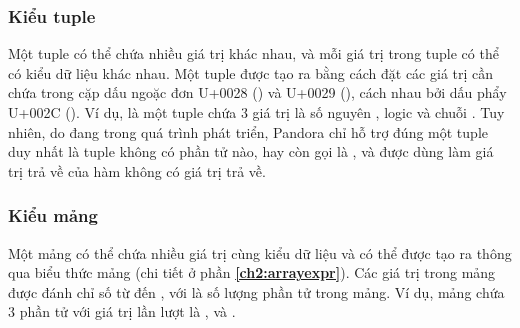 \subsubsection{Kiểu tuple}

    Một tuple có thể chứa nhiều giá trị khác nhau, và mỗi giá trị trong tuple có thể có kiểu dữ liệu khác nhau. Một tuple được tạo ra bằng cách đặt các giá trị cần chứa trong cặp dấu ngoặc đơn U+0028 (\kw{(}) và U+0029 (\kw{)}), cách nhau bởi dấu phẩy U+002C (\kw{,}). Ví dụ,  là một tuple chứa 3 giá trị là số nguyên , logic  và chuỗi . Tuy nhiên, do đang trong quá trình phát triển, Pandora chỉ hỗ trợ đúng một tuple duy nhất là tuple không có phần tử nào, hay còn gọi là , và được dùng làm giá trị trả về của hàm không có giá trị trả về.

\subsubsection{Kiểu mảng}

    Một mảng có thể chứa nhiều giá trị cùng kiểu dữ liệu và có thể được tạo ra thông qua biểu thức mảng (chi tiết ở phần \textbf{\ref{ch2:arrayexpr}}). Các giá trị trong mảng được đánh chỉ số từ  đến , với  là số lượng phần tử trong mảng. Ví dụ, mảng \kw{[1, 2, 3]} chứa 3 phần tử với giá trị lần lượt là ,  và .
